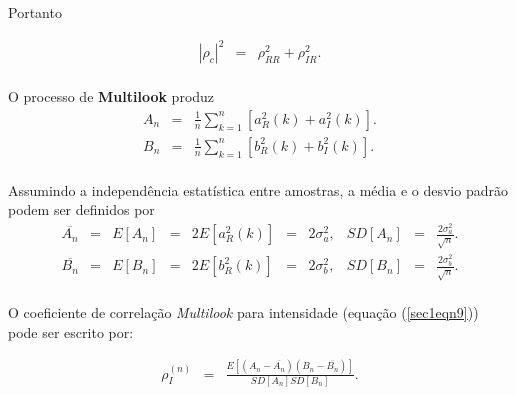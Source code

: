 \documentclass[10pt,a4paper]{article}
\begin{document}
Portanto

\begin{equation}\label{sec1eqn19}
\begin{array}{ccc}
	\left|\rho_c\right|^2&=&\rho_{RR}^2+\rho_{IR}^2. \\
\end{array}
\end{equation}

O processo de {\bf Multilook} produz
\begin{equation}\label{sec1eqn20}
\begin{array}{ccc}
	A_n&=&\frac{1}{n}\displaystyle{\sum_{k=1}^{n} [a_{R}^2(k)+a_{I}^2(k)]}. \\
	B_n&=&\frac{1}{n}\displaystyle{\sum_{k=1}^{n} [b_{R}^2(k)+b_{I}^2(k)]}. \\
\end{array}
\end{equation}


Assumindo a independência estatística entre amostras, a média e o desvio padrão podem ser definidos por
\begin{equation}\label{sec1eqn21}
\begin{array}{cccccccccccc}
	\overline{A_n}&=&E[A_n]&=&2E[a_{R}^2(k)]&=&2\sigma_a^2,&SD[A_n]&=&\frac{2\sigma_a^2}{\sqrt{n}}.\\
	\overline{B_n}&=&E[B_n]&=&2E[b_{R}^2(k)]&=&2\sigma_b^2,&SD[B_n]&=&\frac{2\sigma_b^2}{\sqrt{n}}.\\
\end{array}
\end{equation}

O coeficiente de correlação {\it Multilook} para intensidade (equação (\ref{sec1eqn9})) pode ser escrito por:

\begin{equation}\label{sec1eqn22}
\begin{array}{ccc}
	\rho_I^{(n)}&=&\frac{E[(A_n-\overline{A_n})(B_n-\overline{B_n})]}{SD[A_n]SD[B_n]}. \\
\end{array}
\end{equation}
\end{document}
